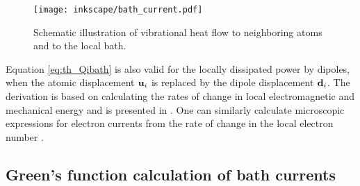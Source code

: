 \begin{figure}
 \begin{center}
 \texttt{[image: inkscape/bath\_current.pdf]}
 \end{center}
 \caption{Schematic illustration of vibrational heat flow to neighboring atoms and to the local bath.}
 \label{fig:vib_currents}
\end{figure}

Equation \eqref{eq:th_Qibath} is also valid for the locally dissipated power by dipoles, when the atomic displacement $\mathbf{u}_i$ is replaced by the dipole displacement $\mathbf{d}_i$. The derivation is based on calculating the rates of change in local electromagnetic and mechanical energy and is presented in . One can similarly calculate microscopic expressions for electron currents from the rate of change in the local electron number \cite{roy07}. 




\subsection{Green's function calculation of bath currents}
\label{sec:th_bathcurrents}

